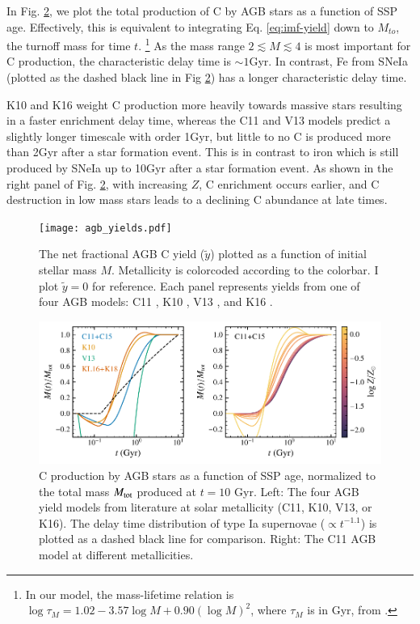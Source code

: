 \documentclass[12pt,oneside]{report}
\begin{document}
In Fig. \ref{fig:agb-ssp}, we plot the total production of C by AGB stars as a function of SSP age.
Effectively, this is equivalent to integrating Eq. \ref{eq:imf-yield} down to $M_{to}$, the turnoff mass for time $t$. 
\footnote{In our model, the mass-lifetime relation is
$\log \tau_M = 1.02 - 3.57\log M + 0.90 \left(\log M\right)^2$,
where $\tau_M$ is in Gyr,
from \citet{larson74}.}
As the mass range $2\lesssim M \lesssim 4$ is most important for C production, the characteristic delay time is $\sim 1$Gyr. In contrast, Fe from SNeIa (plotted as the dashed black line in Fig \ref{fig:agb-ssp}) has a longer characteristic delay time.

K10 and K16 weight C production more heavily towards massive stars resulting in a faster enrichment delay time, whereas the C11 and V13 models predict a slightly longer timescale with order 1Gyr, but little to no C is produced more than 2Gyr after a star formation event. This is in contrast to iron which is still produced by SNeIa up to 10Gyr after a star formation event. 
As shown in the right panel of Fig. \ref{fig:agb-ssp}, with increasing $Z$, C enrichment occurs earlier, and C destruction in low mass stars leads to a declining C abundance at late times.
    

\begin{figure}
    \centering
 	    \texttt{[image: agb\_yields.pdf]}
        \caption[AGB C yields]{The net fractional AGB C yield ($\tilde{y}$) plotted as a function of initial stellar mass $M$. Metallicity is colorcoded according to the colorbar. I plot $\tilde{y}=0$ for reference. Each panel represents yields from one of four AGB models: C11 \citep{cristallo+11, cristallo+15}, K10 \citep{karakas10}, V13 \citep{ventura+13,ventura+14,ventura+18}, and K16 \citep{KL16, karakas+18}.
        }
        \label{fig:y_agb}
\end{figure}
\begin{figure}
    \includegraphics[scale=1]{y_agb_t2.pdf}

    \caption[AGB yields delay time distribution]{
        C production by AGB stars as a function of SSP age, normalized to the total mass $M_{\rm tot}$ produced at $t=10$ Gyr. Left: The four AGB yield models from literature at solar metallicity (C11, K10, V13, or K16). The delay time distribution of type Ia supernovae ($\propto t^{-1.1}$) is plotted as a dashed black line for comparison. Right: The C11 AGB model at different metallicities. }
    \label{fig:agb-ssp}
\end{figure}
\end{document}
